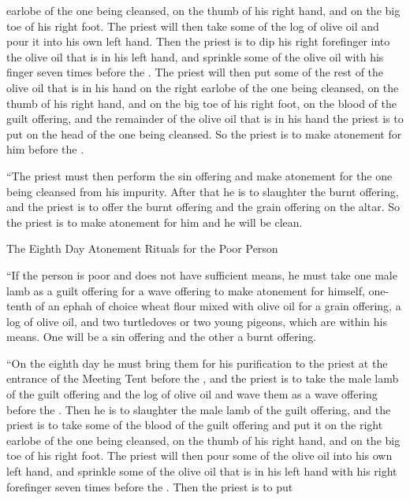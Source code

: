 {earlobe
of the one being cleansed,
on
the thumb
of his right
hand,
and on
the big toe
of his right
foot.
The priest
will then take
some of the log
of olive oil
and pour
it into
his
own left
hand.
Then the priest
is to dip
his right
forefinger
into
the olive oil
that
is in his left
hand,
and sprinkle
some of
the olive oil
with his finger
seven
times
before
the {}.
The priest
will then put
some of the rest
of the olive oil
that
is in
his hand
on
the right
earlobe
of the one being cleansed,
on
the thumb
of his right
hand,
and on
the big toe
of his right
foot,
on
the blood
of the guilt offering,
and the remainder
of the olive oil
that
is in his hand
the priest
is to put
on
the head
of the one being cleansed.
So the priest
is to make atonement
for him before
the {}.
\par }{\PP {}“The priest
must then perform
the sin offering
and make atonement
for the one being cleansed
from his impurity.
After
that he is to slaughter
the burnt offering,
and the priest
is to offer
the burnt offering
and the
grain offering
on
the altar.
So the priest
is to make atonement
for him and he will be clean.
\par }{\SH The Eighth Day Atonement Rituals for the Poor Person
\par }{\PP {}“If
the person is poor
and does not
have sufficient
means,
he must take
one
male lamb
as a guilt offering
for a wave offering
to make atonement
for himself, one-tenth of an ephah
of choice wheat flour
mixed
with olive oil
for a grain offering,
a log
of olive oil,
and two
turtledoves
or
two
young
pigeons,
which
are within his means.
One
will be
a sin offering
and the other
a burnt offering.
\par }{\PP {}“On the eighth
day
he must bring
them for his purification
to
the priest
at
the entrance
of the Meeting
Tent
before
the {},
and the priest
is to take
the
male lamb
of the guilt offering
and the
log
of olive oil
and wave
them as a wave offering
before
the {}.
Then he is to slaughter
the male lamb
of the guilt offering,
and the priest
is to take
some of the blood
of the guilt offering
and put
it on
the right
earlobe
of the one being cleansed,
on the thumb
of his right
hand,
and on
the big toe
of his right
foot.
The priest
will then pour
some
of the olive oil
into
his own
left
hand,
and sprinkle
some of
the olive oil
that
is in
his left
hand
with his right
forefinger
seven
times
before
the {}.
Then the priest
is to put
}
